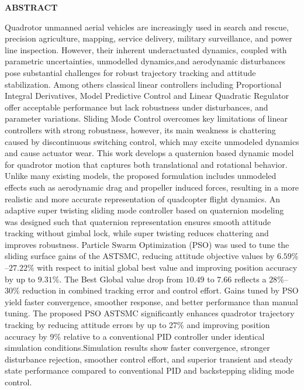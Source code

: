 \documentclass[12pt,a4paper]{report}
\begin{document}
    \newpage
      \begin{center}
        \Large\bfseries ABSTRACT \end{center}
Quadrotor unmanned aerial vehicles  are increasingly used in search and rescue, precision agriculture, mapping, service delivery, military surveillance, and power line inspection. However, their inherent underactuated dynamics, coupled with parametric uncertainties, unmodelled dynamics,and aerodynamic disturbances pose substantial challenges for robust trajectory tracking and attitude stabilization. Among others classical linear controllers including Proportional Integral Derivatives, Model Predictive Control and Linear Quadratic Regulator offer acceptable performance but lack robustness under disturbances, and parameter variations. Sliding Mode Control  overcomes key limitations of linear controllers  with strong robustness, however, its main weakness is chattering caused by discontinuous switching control, which may excite unmodeled dynamics and cause actuator wear. This work develops a quaternion based dynamic model for quadrotor motion that captures both translational and rotational behavior. Unlike many existing models, the proposed formulation includes unmodeled effects such as aerodynamic drag and propeller induced forces, resulting in a more realistic and more accurate representation of quadcopter flight dynamics. An adaptive super twisting sliding mode controller  based on quaternion modeling was designed such that quaternion representation ensures smooth attitude tracking without gimbal lock, while super twisting reduces chattering and improves robustness. Particle Swarm Optimization (PSO) was used to tune the sliding surface gains of the ASTSMC, reducing attitude objective values by \(6.59\%\)–\(27.22\%\) with respect to initial global best value and improving position accuracy by up to \(9.31\%\). The Best Global value  drop from \(10.49\) to \(7.66\) reflects a \(28\%\)–\(30\%\) reduction in combined tracking error and control effort. Gains tuned by PSO yield faster convergence, smoother response, and better performance than manual tuning. The proposed PSO ASTSMC significantly enhances quadrotor trajectory tracking by reducing attitude errors by up to 27\% and improving position accuracy by 9\% relative to a conventional PID  controller under identical simulation conditions.Simulation results show faster convergence, stronger disturbance rejection, smoother control effort, and superior transient and steady state performance compared to conventional PID and backstepping sliding mode control.
\end{document}
